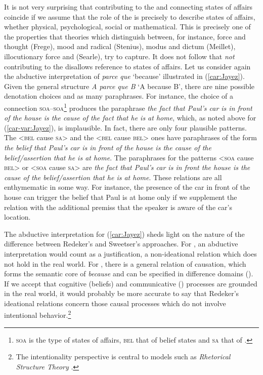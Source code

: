 \documentclass[output=paper,colorlinks,citecolor=brown]{langscibook}
\begin{document}
It is not very surprising that contributing to the  and connecting states of affairs coincide if we assume that the role of the  is precisely to describe states of affairs, whether physical, psychological, social or mathematical. This is precisely one of the properties that theories which distinguish between, for instance, force and thought (Frege), mood and radical (Stenius), modus and dictum (Meillet), illocutionary force and  (Searle), try to capture. It does not follow that \textit{not} contributing to the  disallows reference to states of affairs. Let us consider again the abductive interpretation of \textit{parce que} `because' illustrated in (\ref{car:Jayez}). Given the general structure \textit{A parce que B} `A because B', there are nine possible denotation choices and as many paraphrases. For instance, the choice of a connection \textsc{soa}--\textsc{soa}\footnote{\textsc{soa} is the type of states of affairs, \textsc{bel} that of belief states and \textsc{sa} that of .} produces the paraphrase \textit{the fact that Paul's car is in front of the house is the cause of the fact that he is at home}, which, as noted above for (\ref{car-var:Jayez}), is implausible. In fact, there are only four plausible patterns. The <\textsc{bel} cause \textsc{sa}> and the <\textsc{bel} cause \textsc{bel}> ones have paraphrases of the form \textit{the belief that Paul's car is in front of the house is the cause of the belief/assertion that he is at home}. The paraphrases for the patterns <\textsc{soa} cause \textsc{bel}> or <\textsc{soa} cause \textsc{sa}> are \textit{the fact that Paul's car is in front the house is the cause of the belief/assertion that he is at home}. These relations are all enthymematic in some way. For instance, the presence of the car in front of the house can trigger the belief that Paul is at home only if we supplement the relation with the additional premiss that the speaker is aware of the car's location.

The abductive interpretation for (\ref{car:Jayez}) sheds light on the nature of the difference between Redeker's and Sweetser's approaches. For \citet{Redeker:1990}, an abductive interpretation would count as a justification, a non-ideational relation which does not hold in the real world. For \citet{Sweetser:1990}, there is a general relation of causation, which forms the semantic core of \textit{because} and can be specified in difference domains (). If we accept that cognitive (beliefs) and communicative () processes are grounded in the real world, it would probably be more accurate to say that Redeker's ideational relations concern those causal processes which do not involve intentional behavior.\footnote{The intentionality perspective is central to  models such as \textit{Rhetorical Structure Theory} \citep{TaboadaandMann:2006}.}
\end{document}
